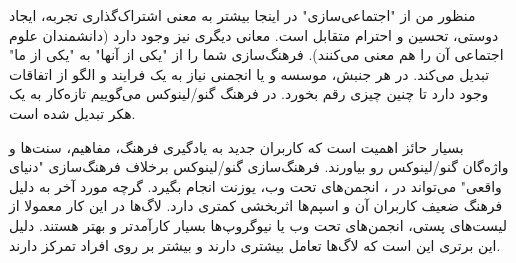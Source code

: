 
منظور من از "اجتماعی‌سازی" در اینجا بیشتر به معنی اشتراک‌گذاری تجربه،
ایجاد دوستی، تحسین و احترام متقابل است. معانی دیگری نیز وجود دارد
(دانشمندان علوم اجتماعی آن را
هم معنی می‌کنند).
فرهنگ‌سازی شما را از "یکی از آنها" به "یکی از ما" تبدیل می‌کند.
در هر جنبش، موسسه و یا انجمنی نیاز به یک فرایند و الگو از اتفاقات وجود دارد
تا چنین چیزی رقم بخورد. در فرهنگ گنو/لینوکس می‌گوییم تازه‌کار به یک هکر تبدیل شده است.


بسیار حائز اهمیت است که کاربران جدید به یادگیری فرهنگ، مفاهیم، سنت‌ها
و واژه‌گان گنو/لینوکس رو بیاورند. فرهنگ‌سازی گنو/لینوکس برخلاف فرهنگ‌سازی "دنیای واقعی"
می‌تواند در
،
انجمن‌های تحت وب، یوزنت انجام بگیرد. گرچه مورد آخر به دلیل فرهنگ ضعیف کاربران آن
و اسپم‌ها اثربخشی کمتری دارد.
لاگ‌ها در این کار معمولا از لیست‌های پستی، انجمن‌های تحت وب یا نیوگروپ‌ها بسیار کارآمدتر
و بهتر هستند. دلیل این برتری این است که لاگ‌ها تعامل بیشتری دارند و بیشتر بر روی
افراد تمرکز دارند.

